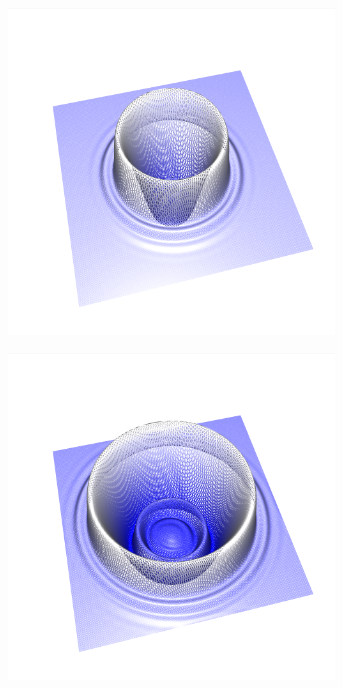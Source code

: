 \documentclass[crop=false,10pt,ngerman]{standalone}
\begin{document}
\begin{figure}[p]
\begin{subfigure}[b]{0.24\textwidth}
          \includegraphics[trim={2cm 1.5cm 1.2cm 1.0cm},clip,width=0.95\textwidth]{images/quad_wave_1.png}
          \caption{}
        \end{subfigure}
        \begin{subfigure}[b]{0.24\textwidth}
          \center
          \includegraphics[trim={2cm 1.5cm 1.2cm 1.0cm},clip,width=0.95\textwidth]{images/quad_wave_2.png}

\end{subfigure}
\end{figure}
\end{document}
